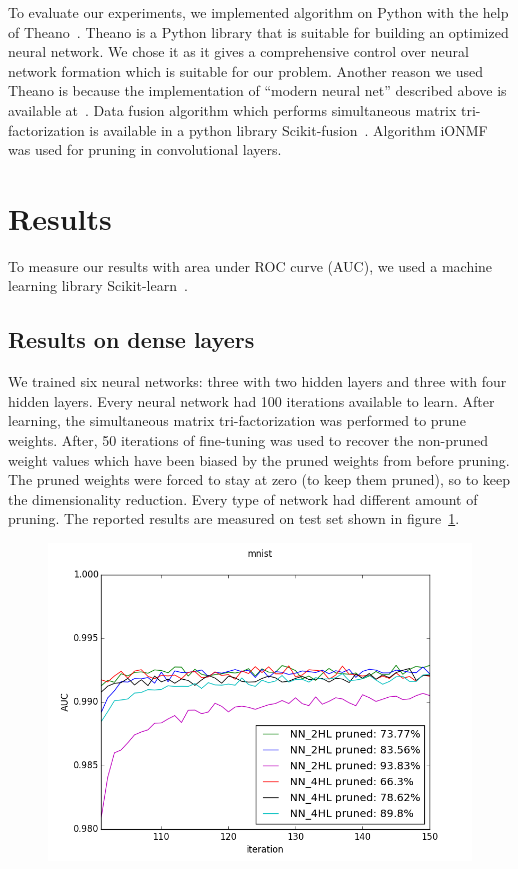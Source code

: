 \documentclass{article} %
\begin{document}
To evaluate our experiments, we implemented algorithm on Python with the help
of Theano~\cite{Bastien-Theano-2012, bergstra+al:2010-scipy}. Theano is a
Python library that is suitable for building an optimized neural network. We
chose it as it gives a comprehensive control over neural network formation
which is suitable for our problem. Another reason we used Theano is because the
implementation of “modern neural net” described above is available 
at~\cite{github}.
Data fusion algorithm which performs simultaneous matrix
tri-factorization is available in a python library
Scikit-fusion~\cite{zitnik2015data}. Algorithm iONMF~\cite{...} was used for 
pruning in convolutional layers.


\section{Results}
 To measure our results with area under ROC 
curve (AUC), we used a machine
learning library Scikit-learn~\cite{scikit-learn}.

\subsection{Results on dense layers}
We trained six neural networks: 
three with two hidden layers and three with four 
hidden layers. Every neural network had 100 iterations available to learn. After 
learning, the simultaneous matrix tri-factorization was performed to prune 
weights. After, 50 iterations of fine-tuning was used to recover the non-pruned 
weight values which have been biased by the pruned weights from before 
pruning. The pruned weights were forced to stay at zero (to keep 
them pruned), so to keep the dimensionality reduction. 
Every type of network had different amount of pruning. 
The reported results are measured  on test set 
shown in figure~\ref{f:results}. 

\begin{figure}[!ht]
\centering
\includegraphics[width=0.8\linewidth]{mnist_new.png}
\label{f:results}
\end{figure}
\end{document}
